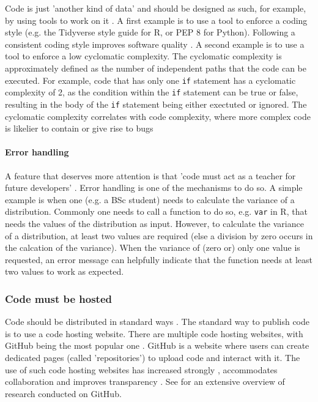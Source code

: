 Code is just 'another kind of data' and should be designed 
as such, for example, by using tools to work on it \cite{wilson2022twelve}.
A first example is to use a tool to enforce a coding style 
(e.g. the Tidyverse style guide \cite{wickham2019advanced} for R,
or PEP 8 \cite{van2001pep} for Python).
Following a consistent coding style improves software quality \cite{fang2001}.
A second example is to use a tool to enforce a low cyclomatic complexity.
The cyclomatic complexity is approximately defined 
as the number of independent paths that
the code can be executed. 
For example, code that has only one \verb|if| statement
has a cyclomatic complexity of 2, as the condition within the \verb|if|
statement can be true or false,
resulting in the body of the \verb|if| statement being either
exectuted or ignored.
The cyclomatic complexity correlates with code complexity,
where more complex code is likelier to contain or give rise to bugs 
\cite{abd2018calculating,chen2019empirical,zimmermann2008predicting}

\paragraph{Error handling}

A feature that deserves more attention
is that 'code must act as a teacher for future developers' \cite{sadowski2018modern}.
Error handling is one of the mechanisms to do so.
A simple example is when one (e.g. a BSc student) 
needs to calculate the variance of a distribution.
Commonly one needs to call a function to do so, 
e.g. \verb|var| in R, that needs the values of the distribution
as input.
However, to calculate the variance of a distribution, at least two values
are required (else a division by zero occurs in the calcation of the variance). 
When the variance of (zero or) only one value is requested,
an error message can helpfully indicate that the function 
needs at least two values to work as expected.

\subsubsection{Code must be hosted}

Code should be distributed in standard ways \cite{peng2006reproducible}.
The standard way to publish code is to use a code hosting website.
There are multiple code hosting websites, 
with GitHub being the most popular one \cite{cosentino2017systematic}.
GitHub is a website where users can create dedicated pages (called 'repositories')
to upload code and interact with it.
The use of such code hosting websites
has increased strongly \cite{russell2018large},
accommodates collaboration \cite{perez2016ten}
and improves transparency \cite{gorgolewski2016practical}.
See \cite{cosentino2017systematic} for an extensive overview of
research conducted on GitHub.


